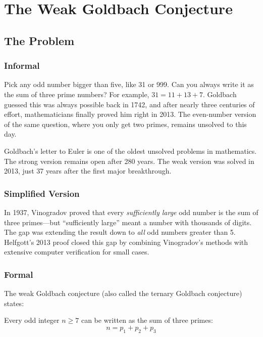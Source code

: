 \let\LocalMacro\relax

\chapter{The Weak Goldbach Conjecture}

\section{The Problem}

\subsection{Informal}
Pick any odd number bigger than five, like 31 or 999. Can you always write it as the sum of three prime numbers? For example, $31 = 11 + 13 + 7$. Goldbach guessed this was always possible back in 1742, and after nearly three centuries of effort, mathematicians finally proved him right in 2013. The even-number version of the same question, where you only get two primes, remains unsolved to this day.

\begin{historicalbox}
Goldbach's letter to Euler is one of the oldest unsolved problems in mathematics. The strong version remains open after 280 years. The weak version was solved in 2013, just 37 years after the first major breakthrough.
\end{historicalbox}

\subsection{Simplified Version}
In 1937, Vinogradov proved that every \emph{sufficiently large} odd number is the sum of three primes---but ``sufficiently large'' meant a number with thousands of digits. The gap was extending the result down to \emph{all} odd numbers greater than 5. Helfgott's 2013 proof closed this gap by combining Vinogradov's methods with extensive computer verification for small cases.

\subsection{Formal}
The weak Goldbach conjecture (also called the ternary Goldbach conjecture) states:
\begin{conjecture}
Every odd integer $n \geq 7$ can be written as the sum of three primes:
\[
n = p_1 + p_2 + p_3
\]
\end{conjecture}

